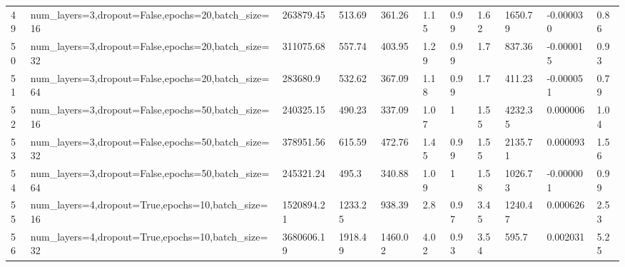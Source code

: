 \begin{longtable}{C{0.8cm} L{2cm} C{1.15cm} C{1.15cm} C{1.15cm} C{1.15cm} C{0.85cm} C{1.25cm} C{1.2cm} C{1.5cm} C{1.0cm}}
49 & num\_layers=3,\newline dropout=False,\newline epochs=20,\newline batch\_size=16 & 263879.45 & 513.69 & 361.26 & 1.15 & 0.99 & 1.62 & 1650.79 & -0.000030 & 0.86 \\
50 & num\_layers=3,\newline dropout=False,\newline epochs=20,\newline batch\_size=32 & 311075.68 & 557.74 & 403.95 & 1.29 & 0.99 & 1.7 & 837.36 & -0.000015 & 0.93 \\
51 & num\_layers=3,\newline dropout=False,\newline epochs=20,\newline batch\_size=64 & 283680.9 & 532.62 & 367.09 & 1.18 & 0.99 & 1.7 & 411.23 & -0.000051 & 0.79 \\
52 & num\_layers=3,\newline dropout=False,\newline epochs=50,\newline batch\_size=16 & 240325.15 & 490.23 & 337.09 & 1.07 & 1 & 1.55 & 4232.35 & 0.000006 & 1.04 \\
53 & num\_layers=3,\newline dropout=False,\newline epochs=50,\newline batch\_size=32 & 378951.56 & 615.59 & 472.76 & 1.45 & 0.99 & 1.55 & 2135.71 & 0.000093 & 1.56 \\
54 & num\_layers=3,\newline dropout=False,\newline epochs=50,\newline batch\_size=64 & 245321.24 & 495.3 & 340.88 & 1.09 & 1 & 1.58 & 1026.73 & -0.000001 & 0.99 \\
55 & num\_layers=4,\newline dropout=True,\newline epochs=10,\newline batch\_size=16 & 1520894.21 & 1233.25 & 938.39 & 2.8 & 0.97 & 3.45 & 1240.47 & 0.000626 & 2.53 \\
56 & num\_layers=4,\newline dropout=True,\newline epochs=10,\newline batch\_size=32 & 3680606.19 & 1918.49 & 1460.02 & 4.02 & 0.93 & 3.54 & 595.7 & 0.002031 & 5.25 \\

\end{longtable}
